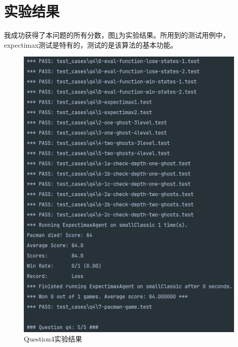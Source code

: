 \section{实验结果}
%
%
我成功获得了本问题的所有分数，图\ref{q4}为实验结果。所用到的测试用例中，expectimax测试是特有的，测试的是该算法的基本功能。
\begin{figure}[H]
    \centering
    \includegraphics[scale = 0.7]{pic/q4.png}
    \caption{Question4实验结果}\label{q4}
\end{figure}
%
%
%
%
%
